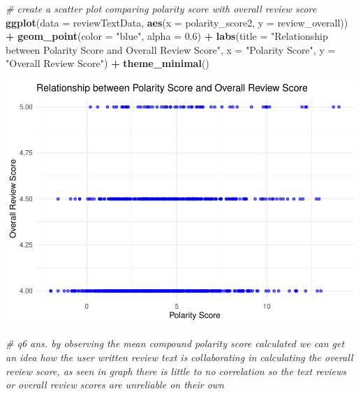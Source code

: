 \documentclass[
  a4paper,
]{article}
\newenvironment{Shaded}{\begin{snugshade}}{\end{snugshade}}
\newcommand{\AttributeTok}[1]{\textcolor[rgb]{0.13,0.29,0.53}{#1}}
\newcommand{\CommentTok}[1]{\textcolor[rgb]{0.56,0.35,0.01}{\textit{#1}}}
\newcommand{\FloatTok}[1]{\textcolor[rgb]{0.00,0.00,0.81}{#1}}
\newcommand{\FunctionTok}[1]{\textcolor[rgb]{0.13,0.29,0.53}{\textbf{#1}}}
\newcommand{\NormalTok}[1]{#1}
\newcommand{\SpecialCharTok}[1]{\textcolor[rgb]{0.81,0.36,0.00}{\textbf{#1}}}
\newcommand{\StringTok}[1]{\textcolor[rgb]{0.31,0.60,0.02}{#1}}
\begin{document}
\begin{Shaded}
\begin{Highlighting}[]
\CommentTok{\# create a scatter plot comparing polarity score with overall review score}
\FunctionTok{ggplot}\NormalTok{(}\AttributeTok{data =}\NormalTok{ reviewTextData, }\FunctionTok{aes}\NormalTok{(}\AttributeTok{x =}\NormalTok{ polarity\_score2, }\AttributeTok{y =}\NormalTok{ review\_overall)) }\SpecialCharTok{+}
  \FunctionTok{geom\_point}\NormalTok{(}\AttributeTok{color =} \StringTok{"blue"}\NormalTok{, }\AttributeTok{alpha =} \FloatTok{0.6}\NormalTok{) }\SpecialCharTok{+}
  \FunctionTok{labs}\NormalTok{(}\AttributeTok{title =} \StringTok{"Relationship between Polarity Score and Overall Review Score"}\NormalTok{,}
       \AttributeTok{x =} \StringTok{"Polarity Score"}\NormalTok{,}
       \AttributeTok{y =} \StringTok{"Overall Review Score"}\NormalTok{) }\SpecialCharTok{+}
  \FunctionTok{theme\_minimal}\NormalTok{()}
\end{Highlighting}
\end{Shaded}

\includegraphics{finalfrfr_files/figure-latex/unnamed-chunk-25-1.pdf}

\begin{Shaded}
\begin{Highlighting}[]
\CommentTok{\# q6 ans. by observing the mean compound polarity score calculated we can get an idea how the user written review text is collaborating in calculating the overall review score, as seen in graph there is little to no correlation so the text reviews or overall review scores are unreliable on their own}
\end{Highlighting}
\end{Shaded}
\end{document}

